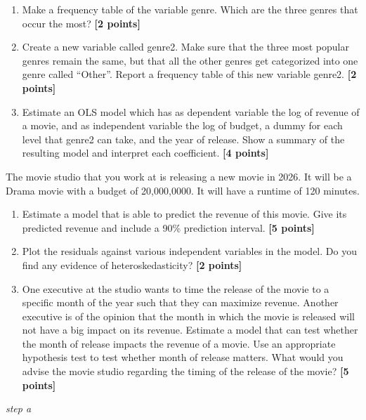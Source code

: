 \documentclass[
]{article}
\newenvironment{Shaded}{\begin{snugshade}}{\end{snugshade}}
\newcommand{\CommentTok}[1]{\textcolor[rgb]{0.56,0.35,0.01}{\textit{#1}}}
\newcommand{\FunctionTok}[1]{\textcolor[rgb]{0.13,0.29,0.53}{\textbf{#1}}}
\newcommand{\NormalTok}[1]{#1}
\newcommand{\SpecialCharTok}[1]{\textcolor[rgb]{0.81,0.36,0.00}{\textbf{#1}}}
\providecommand{\tightlist}{%
  \setlength{\itemsep}{0pt}\setlength{\parskip}{0pt}}
\begin{document}
\begin{enumerate}
\def\labelenumi{\alph{enumi}.}
\tightlist
\item
  Make a frequency table of the variable genre. Which are the three
  genres that occur the most? \textbf{[2 points]}
\item
  Create a new variable called genre2. Make sure that the three most
  popular genres remain the same, but that all the other genres get
  categorized into one genre called ``Other''. Report a frequency table
  of this new variable genre2. \textbf{[2 points]}
\item
  Estimate an OLS model which has as dependent variable the log of
  revenue of a movie, and as independent variable the log of budget, a
  dummy for each level that genre2 can take, and the year of release.
  Show a summary of the resulting model and interpret each coefficient.
  \textbf{[4 points]}
\end{enumerate}

The movie studio that you work at is releasing a new movie in 2026. It
will be a Drama movie with a budget of 20,000,0000. It will have a
runtime of 120 minutes.

\begin{enumerate}
\def\labelenumi{\alph{enumi}.}
\setcounter{enumi}{3}
\tightlist
\item
  Estimate a model that is able to predict the revenue of this movie.
  Give its predicted revenue and include a 90\% prediction interval.
  \textbf{[5 points]}
\item
  Plot the residuals against various independent variables in the model.
  Do you find any evidence of heteroskedasticity? \textbf{[2 points]}
\item
  One executive at the studio wants to time the release of the movie to
  a specific month of the year such that they can maximize revenue.
  Another executive is of the opinion that the month in which the movie
  is released will not have a big impact on its revenue. Estimate a
  model that can test whether the month of release impacts the revenue
  of a movie. Use an appropriate hypothesis test to test whether month
  of release matters. What would you advise the movie studio regarding
  the timing of the release of the movie? \textbf{[5 points]}
\end{enumerate}

\emph{step a}

\begin{Shaded}
\end{Shaded}
\end{document}
